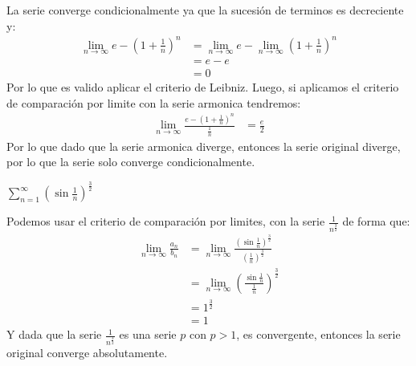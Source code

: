 \documentclass[../main.tex]{subfiles}
\begin{document}
La serie converge condicionalmente ya que la sucesión de terminos es decreciente y:
\begin{align*}
    \lim_{n \to \infty} e - \left(1 + \frac{1}{n}\right)^n &= \lim_{n \to \infty} e - \lim_{n \to \infty} \left(1 + \frac{1}{n}\right)^n\\
    &= e - e\\
    &= 0
\end{align*}
Por lo que es valido aplicar el criterio de Leibniz. Luego, si aplicamos el criterio de comparación por limite con la serie armonica tendremos:
\begin{align*}
    \lim_{n \to \infty} \frac{e - \left(1 + \frac{1}{n}\right)^n}{\frac{1}{n}} &= \frac{e}{2}
\end{align*}
Por lo que dado que la serie armonica diverge, entonces la serie original diverge, por lo que la serie solo converge condicionalmente.

\question $\sum\limits_{n = 1}^\infty \left(\sin \frac{1}{n}\right)^{\frac{3}{2}}$

Podemos usar el criterio de comparación por limites, con la serie $\frac{1}{n^{\frac{3}{2}}}$ de forma que:
\begin{align*}
    \lim_{n \to \infty} \frac{a_n}{b_n} &= \lim_{n \to \infty} \frac{\left(\sin \frac{1}{n}\right)^{\frac{3}{2}}}{\left(\frac{1}{n}\right)^{\frac{3}{2}}}\\
    &= \lim_{n \to \infty} \left(\frac{\sin \frac{1}{n}}{\frac{1}{n}}\right)^{\frac{3}{2}}\\
    &= 1^{\frac{3}{2}}\\
    &= 1
\end{align*}
Y dada que la serie $\frac{1}{n^{\frac{3}{2}}}$ es una serie $p$ con $p > 1$, es convergente, entonces la serie original converge absolutamente.
\end{document}
